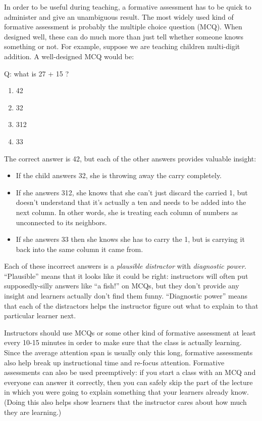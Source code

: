 In order to be useful during teaching, a formative assessment has to
be quick to administer and give an unambiguous result. The most widely
used kind of formative assessment is probably the multiple choice
question (MCQ). When designed well, these can do much more than just
tell whether someone knows something or not. For example, suppose we
are teaching children multi-digit addition. A well-designed MCQ would
be:

\begin{example}
\noindent
Q: what is 27 + 15 ?
\begin{enumerate}
\item 42
\item 32
\item 312
\item 33
\end{enumerate}
\end{example}

The correct answer is 42, but each of the other answers provides
valuable insight:

\begin{itemize}

\item
  If the child answers 32, she is throwing away the carry completely.

\item
  If she answers 312, she knows that she can't just discard the
  carried 1, but doesn't understand that it's actually a ten and needs
  to be added into the next column. In other words, she is treating
  each column of numbers as unconnected to its neighbors.

\item
  If she answers 33 then she knows she has to carry the 1, but is
  carrying it back into the same column it came from.

\end{itemize}

Each of these incorrect answers is a \emph{plausible distractor} with
\emph{diagnostic power}.   ``Plausible'' means that it looks like it
could be right: instructors will often put supposedly-silly answers
like ``a fish!'' on MCQs, but they don't provide any insight and
learners actually don't find them funny. ``Diagnostic power'' means
that each of the distractors helps the instructor figure out what to
explain to that particular learner next.

Instructors should use MCQs or some other kind of formative assessment
at least every 10-15 minutes in order to make sure that the class is
actually learning. Since the average attention span is usually only this
long, formative assessments also help break up instructional time and
re-focus attention. Formative assessments can also be used preemptively:
if you start a class with an MCQ and everyone can answer it correctly,
then you can safely skip the part of the lecture in which you were going
to explain something that your learners already know. (Doing this also
helps show learners that the instructor cares about how much they are
learning.)

